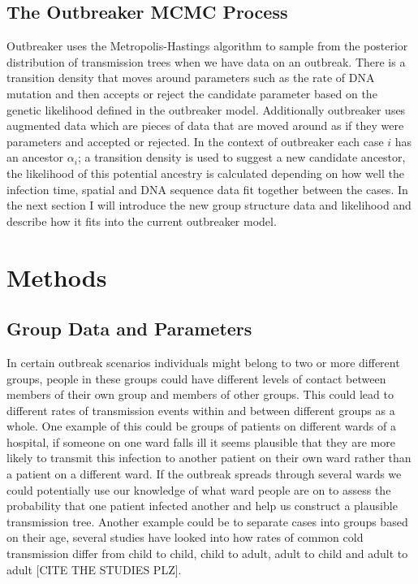 \documentclass[11pt,a4paper]{report}
\begin{document}
\section{The Outbreaker MCMC Process}
Outbreaker uses the Metropolis-Hastings algorithm to sample from the posterior distribution of transmission trees when we have data on an outbreak. There is a transition density that moves around parameters such as the rate of DNA mutation and then accepts or reject the candidate parameter based on the genetic likelihood defined in the outbreaker model. Additionally outbreaker uses augmented data which are pieces of data that are moved around as if they were parameters and accepted or rejected. In the context of outbreaker each case $i$ has an ancestor $\alpha_i$; a transition density is used to suggest a new candidate ancestor, the likelihood of this potential ancestry is calculated depending on how well the infection time, spatial and DNA sequence data fit together between the cases. In the next section I will introduce the new group structure data and likelihood and describe how it fits into the current outbreaker model.


\chapter{Methods}
\section{Group Data and Parameters}
In certain outbreak scenarios individuals might belong to two or more different groups, people in these groups could have different levels of contact between members of their own group and members of other groups. This could lead to different rates of transmission events within and between different groups as a whole. One example of this could be groups of patients on different wards of a hospital, if someone on one ward falls ill it seems plausible that they are more likely to transmit this infection to another patient on their own ward rather than a patient on a different ward. If the outbreak spreads through several wards we could potentially use our knowledge of what ward people are on to assess the probability that one patient infected another and help us construct a plausible transmission tree. Another example could be to separate cases into groups based on their age, several studies have looked into how rates of common cold transmission differ from child to child, child to adult, adult to child and adult to adult [CITE THE STUDIES PLZ].
\end{document}

